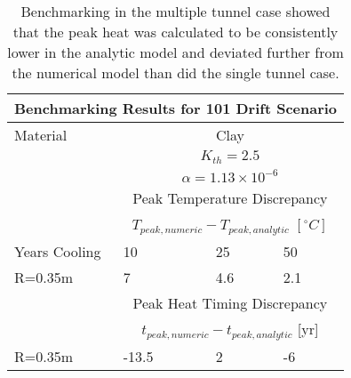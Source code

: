 \begin{table}
  \centering
  \begin{tabular}{|l|l|l|l|}
    \multicolumn{4}{c}{\textbf{Benchmarking Results for 101 Drift Scenario}}\\
    \hline
    Material & \multicolumn{3}{|c|}{Clay} \\
    & \multicolumn{3}{|c|}{$K_{th}=2.5$}\\ 
    & \multicolumn{3}{|c|}{$\alpha=1.13\times10^{-6}$}  \\
    \hline
    & \multicolumn{3}{|c|}{Peak Temperature Discrepancy} \\
    & \multicolumn{3}{|c|}{$T_{peak,numeric}-T_{peak,analytic}$ $[^{\circ}C]$} \\
    \hline
    Years Cooling  & 10  & 25 & 50 \\
    \hline
    R=0.35m   & 7 & 4.6 & 2.1 \\
    \hline
    &\multicolumn{3}{|c|}{Peak Heat Timing Discrepancy}\\
    &\multicolumn{3}{|c|}{ $t_{peak,numeric}-t_{peak,analytic}$ [yr]} \\
    \hline
    R=0.35m       & -13.5   & 2   & -6  \\
    \hline
  \end{tabular}
  \caption{Benchmarking in the multiple tunnel case showed that the peak heat was 
  calculated to be consistently lower in the analytic model and deviated further
  from the numerical model than did the single tunnel case.
  }
  \label{tab:benchMulti}
\end{table}

\clearpage


